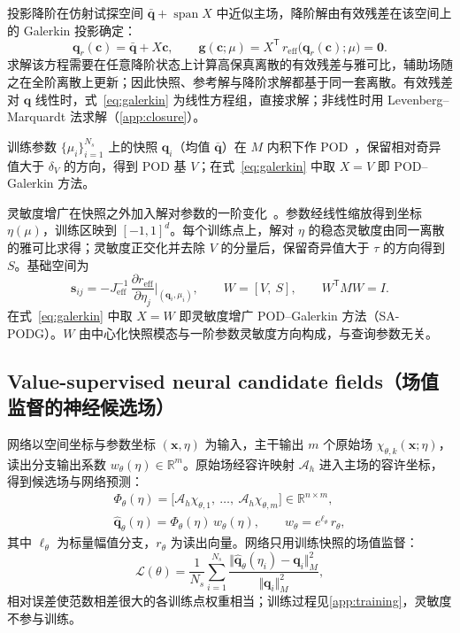 投影降阶在仿射试探空间 $\bar{\mathbf q}+\operatorname{span}X$ 中近似主场，降阶解由有效残差在该空间上的 Galerkin 投影确定：
\begin{equation}
\mathbf q_r(\mathbf c)=\bar{\mathbf q}+X\mathbf c,\qquad
\mathbf g(\mathbf c;\mu)=X^{\mathsf T}\,r_{\mathrm{eff}}\big(\mathbf q_r(\mathbf c);\mu\big)=\mathbf 0 .
\label{eq:galerkin}
\end{equation}
求解该方程需要在任意降阶状态上计算高保真离散的有效残差与雅可比，辅助场随之在全阶离散上更新；因此快照、参考解与降阶求解都基于同一套离散。有效残差对 $\mathbf q$ 线性时，式~\eqref{eq:galerkin} 为线性方程组，直接求解；非线性时用 Levenberg--Marquardt 法求解（\ref{app:closure}）。

训练参数 $\{\mu_i\}_{i=1}^{N_s}$ 上的快照 $\mathbf q_i$（均值 $\bar{\mathbf q}$）在 $M$ 内积下作 POD~\cite{sirovich1987turbulence,berkooz1993proper}，保留相对奇异值大于 $\delta_V$ 的方向，得到 POD 基 $V$；在式~\eqref{eq:galerkin} 中取 $X=V$ 即 POD--Galerkin 方法。

灵敏度增广在快照之外加入解对参数的一阶变化~\cite{hay2009local}。参数经线性缩放得到坐标 $\eta(\mu)$，训练区映到 $[-1,1]^d$。每个训练点上，解对 $\eta$ 的稳态灵敏度由同一离散的雅可比求得；灵敏度正交化并去除 $V$ 的分量后，保留奇异值大于 $\tau$ 的方向得到 $S$。基础空间为
\begin{equation}
\mathbf s_{ij}=-J_{\mathrm{eff}}^{-1}\,\frac{\partial r_{\mathrm{eff}}}{\partial\eta_j}\bigg|_{(\mathbf q_i,\mu_i)},\qquad
W=[V,\ S],\qquad W^{\mathsf T}MW=I .
\label{eq:sensitivity}
\end{equation}
在式~\eqref{eq:galerkin} 中取 $X=W$ 即灵敏度增广 POD--Galerkin 方法（SA-PODG）。$W$ 由中心化快照模态与一阶参数灵敏度方向构成，与查询参数无关。

\subsection{Value-supervised neural candidate fields（场值监督的神经候选场）}
\label{sec:network}

网络以空间坐标与参数坐标 $(\mathbf x,\eta)$ 为输入，主干输出 $m$ 个原始场 $\chi_{\theta,k}(\mathbf x;\eta)$，读出分支输出系数 $w_\theta(\eta)\in\mathbb R^m$。原始场经容许映射 $\mathcal A_h$ 进入主场的容许坐标，得到候选场与网络预测：
\begin{equation}
\begin{gathered}
\Phi_\theta(\eta)=\big[\mathcal A_h\chi_{\theta,1},\ \ldots,\ \mathcal A_h\chi_{\theta,m}\big]\in\mathbb R^{n\times m},\\
\hat{\mathbf q}_\theta(\eta)=\Phi_\theta(\eta)\,w_\theta(\eta),\qquad
w_\theta=e^{\ell_\theta}\,r_\theta ,
\end{gathered}
\label{eq:candidates}
\end{equation}
其中 $\ell_\theta$ 为标量幅值分支，$r_\theta$ 为读出向量。网络只用训练快照的场值监督：
\begin{equation}
\mathcal L(\theta)=\frac1{N_s}\sum_{i=1}^{N_s}\frac{\Vert\hat{\mathbf q}_\theta(\eta_i)-\mathbf q_i\Vert_M^2}{\Vert\mathbf q_i\Vert_M^2},
\label{eq:loss}
\end{equation}
相对误差使范数相差很大的各训练点权重相当；训练过程见\ref{app:training}，灵敏度不参与训练。

